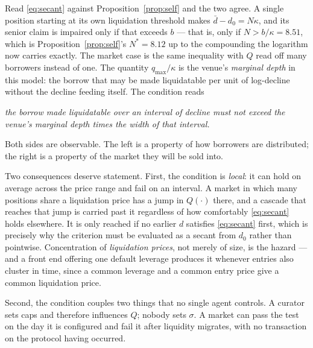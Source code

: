 \documentclass[11pt,a4paper]{article}
\theoremstyle{plain}
\theoremstyle{definition}
\theoremstyle{remark}
\begin{document}
Read \eqref{eq:secant} against Proposition~\ref{prop:self} and the two agree. A single position
starting at its own liquidation threshold makes $\bar d-d_0=N\kappa$, and its senior claim is
impaired only if that exceeds $b$ --- that is, only if $N>b/\kappa=8.51$, which is
Proposition~\ref{prop:self}'s $N^{*}=8.12$ up to the compounding the logarithm now carries
exactly. The market case is the same inequality with $Q$ read off many borrowers instead of one.
The quantity $q_{\max}/\kappa$ is the venue's \emph{marginal depth} in this model: the borrow that
may be made liquidatable per unit of log-decline without the decline feeding itself. The condition
reads

\begin{center}
\emph{the borrow made liquidatable over an interval of decline must not exceed the venue's
marginal depth times the width of that interval.}
\end{center}

Both sides are observable. The left is a property of how borrowers are distributed; the right is
a property of the market they will be sold into.

Two consequences deserve statement. First, the condition is \emph{local}: it can hold on average
across the price range and fail on an interval. A market in which many positions share a
liquidation price has a jump in $Q(\cdot)$ there, and a cascade that reaches that jump is carried
past it regardless of how comfortably \eqref{eq:secant} holds elsewhere. It is only reached if no
earlier $d$ satisfies \eqref{eq:secant} first, which is precisely why the criterion must be
evaluated as a secant from $d_0$ rather than pointwise. Concentration of \emph{liquidation
prices}, not merely of size, is the hazard --- and a front end offering one default leverage
produces it whenever entries also cluster in time, since a common leverage and a common entry
price give a common liquidation price.

Second, the condition couples two things that no single agent controls. A curator sets caps and
therefore influences $Q$; nobody sets $\sigma$. A market can pass the test on the day it is
configured and fail it after liquidity migrates, with no transaction on the protocol having
occurred.
\end{document}
